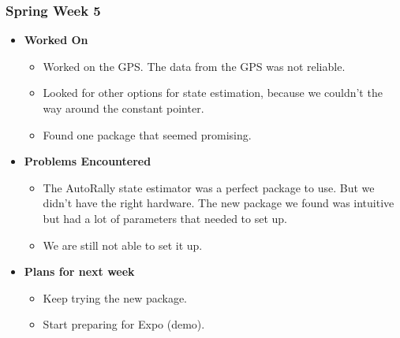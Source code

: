 \documentclass{article}
\begin{document}
\subsubsection{Spring Week 5}
\begin{itemize}
    \item {\textbf{Worked On}}
    \begin{itemize}
      \item Worked on the GPS. The data from the GPS was not reliable.
      \item Looked for other options for state estimation, because we
      couldn't the way around the constant pointer.
      \item Found one package that seemed promising.
    \end{itemize}

    \item {\textbf{Problems Encountered}}
    \begin{itemize}
      \item The AutoRally state estimator was a perfect package to use. But
      we didn't have the right hardware. The new package we found was intuitive
      but had a lot of parameters that needed to set up.
      \item We are still not able to set it up.
    \end{itemize}

    \item{\textbf{Plans for next week}}
    \begin{itemize}
      \item Keep trying the new package.
      \item Start preparing for Expo (demo).
    \end{itemize}

\end{itemize}
\end{document}
